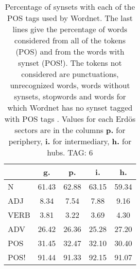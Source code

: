 \begin{table}[h!]
\begin{center}
\begin{tabular}{| l || c | c | c | c |}\hline
 & {\bf g.} & {\bf p.} & {\bf i.} & {\bf h.} \\\hline\hline
N & 61.43  & 62.88  & 63.15  & 59.34 \\\hline
ADJ & 8.34  & 7.54  & 7.88  & 9.16 \\\hline
VERB & 3.81  & 3.22  & 3.69  & 4.30 \\\hline
ADV & 26.42  & 26.36  & 25.28  & 27.20 \\\hline\hline
POS & 31.45  & 32.47  & 32.10  & 30.40 \\\hline
POS! & 91.44  & 91.33  & 92.15  & 91.07 \\\hline
\end{tabular}
\caption{Percentage of synsets with each of the POS tags used by Wordnet. The last lines give the percentage of words considered from all of the tokens (POS) and from the words with synset (POS!). The tokens not considered are punctuations, unrecognized words, words without synsets, stopwords and words for which Wordnet has no synset  tagged with POS tags . Values for each Erd\"os sectors are in the columns {{\bf p.}} for periphery, {{\bf i.}} for intermediary, {{\bf h.}} for hubs. TAG: 6}
\end{center}
\end{table}